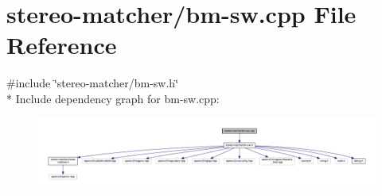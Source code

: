 \hypertarget{bm-sw_8cpp}{}\section{stereo-\/matcher/bm-\/sw.cpp File Reference}
\label{bm-sw_8cpp}
{\ttfamily \#include \char`\"{}stereo-\/matcher/bm-\/sw.\+h\char`\"{}}\\*
Include dependency graph for bm-\/sw.cpp\+:
\nopagebreak
\begin{figure}[H]
\begin{center}
\leavevmode
\includegraphics[width=350pt]{bm-sw_8cpp__incl}
\end{center}
\end{figure}
